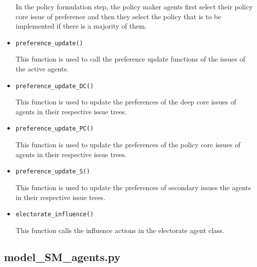 \documentclass[11pt]{article}
\begin{document}
\begin{itemize}
In the policy formulation step, the policy maker agents first select their policy core issue of preference and then they select the policy that is to be implemented if there is a majority of them.

\item \texttt{preference\_update()}

This function is used to call the preference update functions of the issues of the active agents.

\item \texttt{preference\_update\_DC()}

This function is used to update the preferences of the deep core issues of agents in their respective issue trees.

\item \texttt{preference\_update\_PC()}

This function is used to update the preferences of the policy core issues of agents in their respective issue trees.
		
\item \texttt{preference\_update\_S()}

This function is used to update the preferences of secondary issues the agents in their respective issue trees.

\item \texttt{electorate\_influence()}

This function calls the influence actions in the electorate agent class.

\end{itemize}


\subsection{model\_SM\_agents.py}
\end{document}
